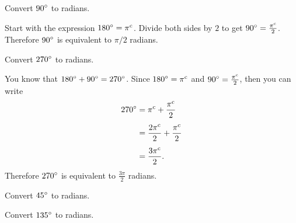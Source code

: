 \documentclass[a4paper,oneside,12pt]{article}
\begin{document}
\begin{example}
\label{ex:90_degrees_to_radians}
Convert ${90}^{\circ}$ to radians.
\end{example}

\begin{solution}
Start with the expression ${180}^{\circ} = {\pi}^{\rm c}$.  Divide both
sides by $2$ to get ${90}^{\circ} = \frac{{\pi}^{\rm c}}{2}$.  Therefore
${90}^{\circ}$ is equivalent to $\pi / 2$ radians.
\end{solution}

\begin{example}
Convert ${270}^{\circ}$ to radians.
\end{example}

\begin{solution}
You know that ${180}^{\circ} + {90}^{\circ} = {270}^{\circ}$.  Since
${180}^{\circ} = {\pi}^{\rm c}$ and
${90}^{\circ} = \frac{{\pi}^{\rm c}}{2}$, then you can write
\begin{align*}
{270}^{\circ}
&=
{\pi}^{\rm c} + \frac{{\pi}^{\rm c}}{2} \\[4pt]
&=
\frac{{2\pi}^{\rm c}}{2} + \frac{{\pi}^{\rm c}}{2} \\[4pt]
&=
\frac{{3\pi}^{\rm c}}{2}.
\end{align*}
Therefore ${270}^{\circ}$ is equivalent to $\frac{3\pi}{2}$ radians.
\end{solution}

\begin{exercise}
Convert ${45}^{\circ}$ to radians.
\end{exercise}


\begin{exercise}
Convert ${135}^{\circ}$ to radians.
\end{exercise}

\end{document}
